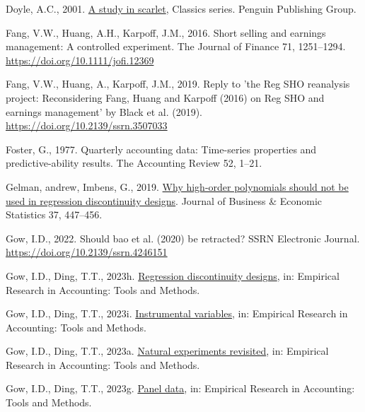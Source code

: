 \documentclass[
  letterpaper,
  DIV=11,
  numbers=noendperiod]{scrartcl}
\newlength{\cslhangindent}
\newlength{\cslentryspacingunit} %
\newenvironment{CSLReferences}[2] %
 {%
  \setlength{\parindent}{0pt}
  \ifodd #1
  \let\oldpar\par
  \def\par{\hangindent=\cslhangindent\oldpar}
  \fi
  \setlength{\parskip}{#2\cslentryspacingunit}
 }%
 {}
\begin{document}
\begin{CSLReferences}{1}{0}
\leavevmode{}%
Doyle, A.C., 2001.
\href{https://books.google.com/books?id=xN2lK7oPTjYC}{A study in
scarlet}, Classics series. Penguin Publishing Group.

\leavevmode{}%
Fang, V.W., Huang, A.H., Karpoff, J.M., 2016. Short selling and earnings
management: A controlled experiment. The Journal of Finance 71,
1251--1294. \url{https://doi.org/10.1111/jofi.12369}

\leavevmode{}%
Fang, V.W., Huang, A., Karpoff, J.M., 2019. Reply to 'the {Reg SHO}
reanalysis project: Reconsidering {Fang, Huang and Karpoff} (2016) on
{Reg SHO} and earnings management' by {Black et al.} (2019).
\url{https://doi.org/10.2139/ssrn.3507033}

\leavevmode{}%
Foster, G., 1977. Quarterly accounting data: Time-series properties and
predictive-ability results. The Accounting Review 52, 1--21.

\leavevmode{}%
Gelman, andrew, Imbens, G., 2019.
\href{https://doi.org/10.1080/07350015.2017.1366909}{Why high-order
polynomials should not be used in regression discontinuity designs}.
Journal of Business \& Economic Statistics 37, 447--456.

\leavevmode{}%
Gow, I.D., 2022. Should bao et al. (2020) be retracted? {SSRN}
Electronic Journal. \url{https://doi.org/10.2139/ssrn.4246151}

\leavevmode{}%
Gow, I.D., Ding, T.T., 2023h.
\href{https://iangow.github.io/far_book/regression-discontinuity-designs.html}{Regression
discontinuity designs}, in: Empirical Research in Accounting: Tools and
Methods.

\leavevmode{}%
Gow, I.D., Ding, T.T., 2023i.
\href{https://iangow.github.io/far_book/iv.html}{Instrumental
variables}, in: Empirical Research in Accounting: Tools and Methods.

\leavevmode{}%
Gow, I.D., Ding, T.T., 2023a.
\href{https://iangow.github.io/far_book/natural-revisited.html}{Natural
experiments revisited}, in: Empirical Research in Accounting: Tools and
Methods.

\leavevmode{}%
Gow, I.D., Ding, T.T., 2023g.
\href{https://iangow.github.io/far_book/panel-data.html}{Panel data},
in: Empirical Research in Accounting: Tools and Methods.


\end{CSLReferences}
\end{document}
